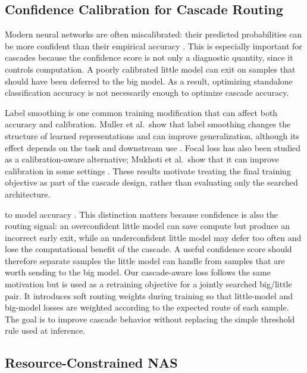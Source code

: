 \documentclass[conference]{IEEEtran}
\begin{document}
\subsection{Confidence Calibration for Cascade Routing}
\label{sec:related:calibration}

Modern neural networks are often miscalibrated: their predicted probabilities
can be more confident than their empirical accuracy \cite{guo2017calibration}.
This is especially important for cascades because the confidence score is not
only a diagnostic quantity, since it controls computation. A poorly calibrated little
model can exit on samples that should have been deferred to the big model. As a
result, optimizing standalone classification accuracy is not necessarily enough
to optimize cascade accuracy.

Label smoothing is one common training modification that can affect both
accuracy and calibration. Muller et al.\ show that label smoothing changes the
structure of learned representations and can improve generalization, although
its effect depends on the task and downstream use \cite{mueller2019labelsmoothing}.
Focal loss has also been studied as a calibration-aware alternative; Mukhoti et
al.\ show that it can improve calibration in some settings
\cite{mukhoti2020calibrating}. These results motivate treating the final
training objective as part of the cascade design, rather than evaluating only
the searched architecture.

to model accuracy \cite{li2021learningtocascade}. This distinction matters
because confidence is also the routing signal: an overconfident little model
can save compute but produce an incorrect early exit, while an underconfident
little model may defer too often and lose the computational benefit of the
cascade. A useful confidence score should therefore separate samples the little
model can handle from samples that are worth sending to the big model. Our
cascade-aware loss follows the same motivation but is used as a retraining
objective for a jointly searched big/little pair. It introduces soft routing
weights during training so that little-model and big-model losses are weighted
according to the expected route of each sample. The goal is to improve cascade
behavior without replacing the simple threshold rule used at inference.


\subsection{Resource-Constrained NAS}
\label{sec:related:hwnas}
\end{document}
